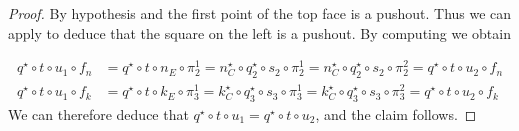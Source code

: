\documentclass[3p]{elsarticle}
\newcommand{\eg}[0]{\mathbf{EGG}}
\def\D{\textbf {\textup{D}}}
\theoremstyle{remark}
\theoremstyle{definition}
\begin{document}
\begin{proof}
	\noindent
	\begin{minipage}[l]{.2\linewidth}
	\end{minipage}\hfill
	\begin{minipage}[r]{.8\linewidth}
			\setlength{\parindent}{1.5em}
			By hypothesis and the first point of  the top face is a pushout. Thus we can apply  to deduce that the square on the left is a pushout. 
			By computing we obtain
	\end{minipage}
\vspace{-.3cm}
	\begin{align*}
		q^\star \circ t \circ u_1 \circ f_n &= q^\star \circ t \circ n_E \circ \pi_2^1 = n_C^\star \circ q_2^\star \circ s_2 \circ \pi_2^1 = n_C^\star \circ q_2^\star \circ s_2 \circ \pi_2^2 =q^\star \circ t \circ u_2 \circ f_n \\
		q^\star \circ t \circ u_1 \circ f_k &= q^\star \circ t \circ k_E \circ \pi_3^1 = k_C^\star \circ q_3^\star \circ s_3 \circ \pi_3^1 = k_C^\star \circ q_3^\star \circ s_3 \circ \pi_3^2 =q^\star \circ t \circ u_2 \circ f_k
	\end{align*}
	We can therefore deduce that $q^\star \circ t \circ u_1 = q^\star \circ t \circ u_2$, and the claim follows.
\end{proof}


\iffalse 
\limt*
\begin{proof}\label{proof:tlim}
Let $F\colon \D\to \eg$ be a diagram of one of the shapes mentioned in the statement. Let $((\mathcal{L}, l), \{\pi_d\}_{d\in \D})$ be a limiting cone for $k_\Sigma \circ F$. By \Cref{lim}, \Cref{prop:term}, and \Cref{proof:elim} we know that $\mathcal{L}$ is an e-termgraph and we can conclude.
\end{proof}
\fi 
\end{document}

